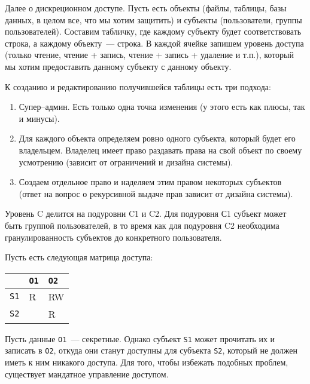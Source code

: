 Далее о дискреционном доступе. Пусть есть объекты (файлы, таблицы, базы данных,
в целом все, что мы хотим защитить) и субъекты (пользователи, группы
пользователей). Составим табличку, где каждому субъекту будет соответствовать
строка, а каждому объекту~--- строка. В каждой ячейке запишем уровень доступа
(только чтение, чтение + запись, чтение + запись + удаление и т.п.), который мы
хотим предоставить данному субъекту с данному объекту.

К созданию и редактированию получившейся таблицы есть три подхода:
\begin{enumerate}
\item
  Супер--админ. Есть только одна точка изменения (у этого есть как плюсы, так и
  минусы).

\item
  Для каждого объекта определяем ровно одного субъекта, который будет его
  владельцем. Владелец имеет право раздавать права на свой объект по своему
  усмотрению (зависит от ограничений и дизайна системы).

\item
  Создаем отдельное право  и наделяем этим правом некоторых
  субъектов (ответ на вопрос о рекурсивной выдаче прав зависит от дизайна
  системы).
\end{enumerate}

\begin{remark}
  Уровень C делится на подуровни C1 и C2. Для подуровня С1 субъект может быть
  группой пользователей, в то время как для подуровня C2 необходима
  гранулированность субъектов до конкретного пользователя.
\end{remark}


Пусть есть следующая матрица доступа:
\begin{table}[h!]
  \centering

  \begin{tabularx}{0.3 \textwidth}{ X | X  X }
                & \texttt{O1} & \texttt{O2} \\ \hline
    \texttt{S1} & R           & RW          \\
    \texttt{S2} &             & R           \\
  \end{tabularx}
\end{table}

Пусть данные \texttt{O1}~--- секретные. Однако субъект \texttt{S1} может
прочитать их и записать в \texttt{O2}, откуда они станут доступны для субъекта
\texttt{S2}, который не должен иметь к ним никакого доступа. Для того, чтобы
избежать подобных проблем, существует мандатное управление доступом.

